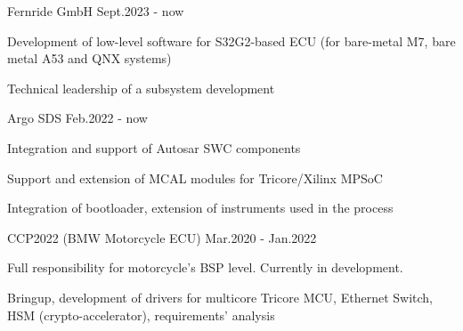 


\begin{cventries}


\cventry
{} %
{Fernride GmbH} %
{} %
{Sept.2023 - now} %
{ %
\begin{cvitems}
\item {Development of low-level software for S32G2-based ECU (for bare-metal M7, bare metal A53 and QNX systems)}
\item {Technical leadership of a subsystem development}
\end{cvitems}
}
\newline
\newline


\cventry
{} %
{Argo SDS} %
{} %
{Feb.2022 - now} %
{ %
\begin{cvitems}
\item {Integration and support of Autosar SWC components }
\item {Support and extension of MCAL modules for Tricore/Xilinx MPSoC }
\item {Integration of bootloader, extension of instruments used in the process }
\end{cvitems}
}
\newline


\cventry
{} %
{CCP2022 (BMW Motorcycle ECU)} %
{} %
{Mar.2020 - Jan.2022} %
{ %
\begin{cvitems}
\item {Full responsibility for motorcycle's BSP level. Currently in development.}
\item {Bringup, development of drivers for multicore Tricore MCU, Ethernet Switch, HSM (crypto-accelerator), requirements' analysis}
\end{cvitems}
}
\newline
\newline


\end{cventries}
